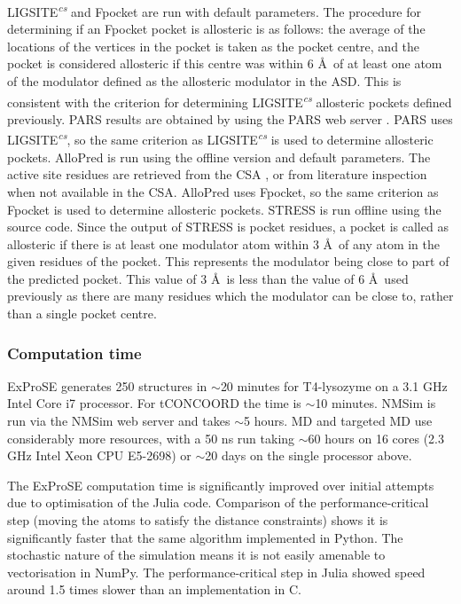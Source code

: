 LIGSITE\textsuperscript{\it cs} \cite{Huang2006} and Fpocket \cite{LeGuilloux2009} are run with default parameters.
The procedure for determining if an Fpocket pocket is allosteric is as follows: the average of the locations of the vertices in the pocket is taken as the pocket centre, and the pocket is considered allosteric if this centre was within 6 \AA\ of at least one atom of the modulator defined as the allosteric modulator in the ASD.
This is consistent with the criterion for determining LIGSITE\textsuperscript{\it cs} allosteric pockets defined previously.
PARS results are obtained by using the PARS web server \cite{Panjkovich2014}.
PARS uses LIGSITE\textsuperscript{\it cs}, so the same criterion as LIGSITE\textsuperscript{\it cs} is used to determine allosteric pockets.
AlloPred is run using the offline version and default parameters.
The active site residues are retrieved from the CSA \cite{Furnham2014}, or from literature inspection when not available in the CSA.
AlloPred uses Fpocket, so the same criterion as Fpocket is used to determine allosteric pockets.
STRESS \cite{Clarke2016} is run offline using the source code.
Since the output of STRESS is pocket residues, a pocket is called as allosteric if there is at least one modulator atom within 3 \AA\ of any atom in the given residues of the pocket.
This represents the modulator being close to part of the predicted pocket.
This value of 3 \AA\ is less than the value of 6 \AA\ used previously as there are many residues which the modulator can be close to, rather than a single pocket centre.


\subsubsection{Computation time}

ExProSE generates 250 structures in $\sim$20 minutes for T4-lysozyme on a 3.1 GHz Intel Core i7 processor.
For tCONCOORD the time is $\sim$10 minutes.
NMSim is run via the NMSim web server and takes $\sim$5 hours.
MD and targeted MD use considerably more resources, with a 50 ns run taking $\sim$60 hours on 16 cores (2.3 GHz Intel Xeon CPU E5-2698) or $\sim$20 days on the single processor above.

The ExProSE computation time is significantly improved over initial attempts due to optimisation of the Julia code.
Comparison of the performance-critical step (moving the atoms to satisfy the distance constraints) shows it is significantly faster that the same algorithm implemented in Python.
The stochastic nature of the simulation means it is not easily amenable to vectorisation in NumPy.
The performance-critical step in Julia showed speed around 1.5 times slower than an implementation in C.



